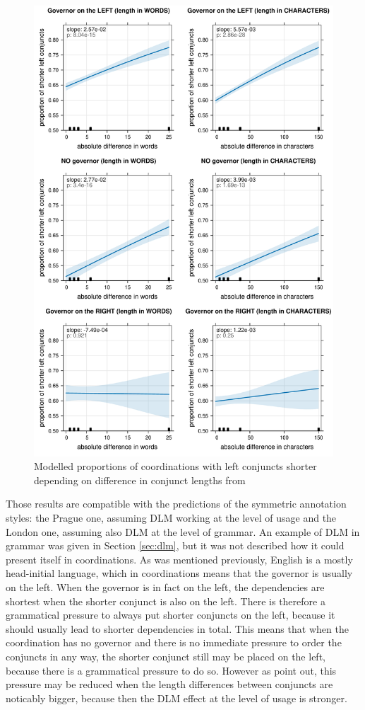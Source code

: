 \begin{figure}[H]
    \includegraphics[scale=0.35]{inputs/ptb-R.pdf}
    \caption{Modelled proportions of coordinations with left conjuncts shorter depending on difference in conjunct lengths from \cite{prz:woz:23}}\label{fig:pw23-results}
\end{figure}

Those results are compatible with the predictions of the symmetric annotation styles: the Prague one, assuming DLM working at the level of usage and the London one, assuming also DLM at the level of grammar. An example of DLM in grammar was given in Section \ref{sec:dlm}, but it was not described how it could present itself in coordinations. As was mentioned previously, English is a mostly head-initial language, which in  coordinations means that the governor is usually on the left. When the governor is in fact on the left, the dependencies are shortest when the shorter conjunct is also on the left. There is therefore a grammatical pressure to always put shorter conjuncts on the left, because it should usually lead to shorter dependencies in total. This means that when the coordination has no governor and there is no immediate pressure to order the conjuncts in any way, the shorter conjunct still may be placed on the left, because there is a grammatical pressure to do so.  However as \cite{prz:woz:23} point out, this pressure may be reduced when the length differences between conjuncts are noticably bigger, because then the DLM effect at the level of usage is stronger. 


